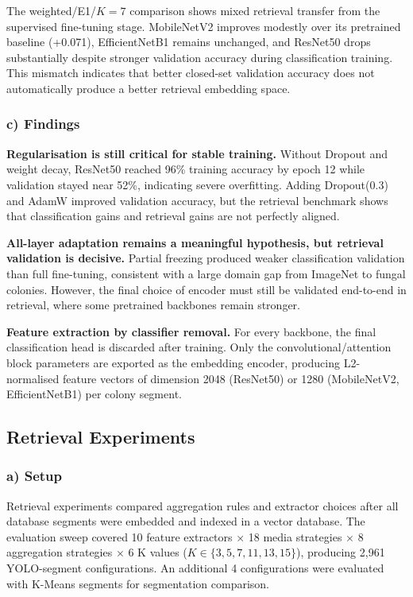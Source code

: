 The weighted/E1/$K=7$ comparison shows mixed retrieval transfer from the supervised fine-tuning stage. MobileNetV2 improves modestly over its pretrained baseline (+0.071), EfficientNetB1 remains unchanged, and ResNet50 drops substantially despite stronger validation accuracy during classification training. This mismatch indicates that better closed-set validation accuracy does not automatically produce a better retrieval embedding space.

\subsubsection{c) Findings}

\textbf{Regularisation is still critical for stable training.} Without Dropout and weight decay, ResNet50 reached 96\% training accuracy by epoch 12 while validation stayed near 52\%, indicating severe overfitting. Adding Dropout(0.3) and AdamW improved validation accuracy, but the retrieval benchmark shows that classification gains and retrieval gains are not perfectly aligned.

\textbf{All-layer adaptation remains a meaningful hypothesis, but retrieval validation is decisive.} Partial freezing produced weaker classification validation than full fine-tuning, consistent with a large domain gap from ImageNet to fungal colonies. However, the final choice of encoder must still be validated end-to-end in retrieval, where some pretrained backbones remain stronger.

\textbf{Feature extraction by classifier removal.} For every backbone, the final classification head is discarded after training. Only the convolutional/attention block parameters are exported as the embedding encoder, producing L2-normalised feature vectors of dimension 2048 (ResNet50) or 1280 (MobileNetV2, EfficientNetB1) per colony segment.


\subsection{Retrieval Experiments}\label{retrieval-experiments}

\subsubsection{a) Setup}

Retrieval experiments compared aggregation rules and extractor choices after all database segments were embedded and indexed in a vector database. The evaluation sweep covered 10 feature extractors $\times$ 18 media strategies $\times$ 8 aggregation strategies $\times$ 6 K values ($K \in \{3,5,7,11,13,15\}$), producing 2,961 YOLO-segment configurations. An additional 4 configurations were evaluated with K-Means segments for segmentation comparison.


